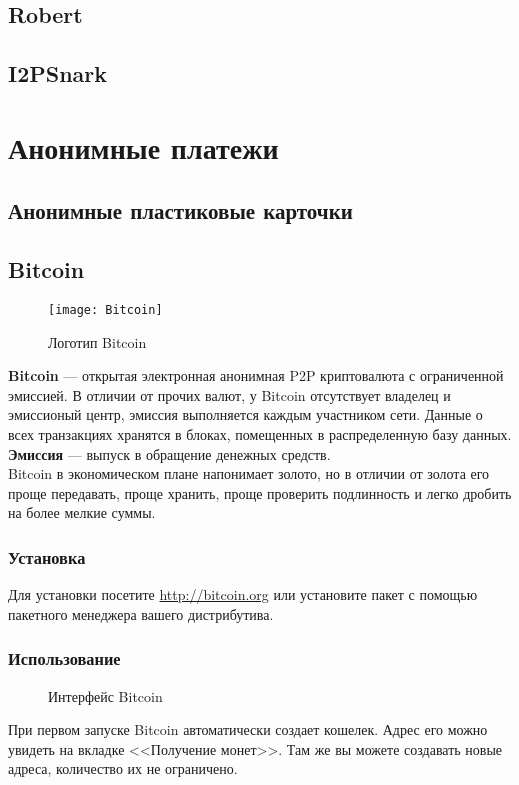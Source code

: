 \subsection{Robert}
\subsection{I2PSnark}

\section{Анонимные платежи}
\subsection{Анонимные пластиковые карточки}
\subsection{Bitcoin}
\begin{wrapfigure}[6]{r}{0.25\linewidth}
\texttt{[image: Bitcoin]}
\caption{Логотип Bitcoin}
\end{wrapfigure}
\textbf{Bitcoin} --- открытая электронная анонимная P2P криптовалюта с ограниченной эмиссией. В отличии от прочих валют, у Bitcoin отсутствует владелец и эмиссионый центр, эмиссия выполняется каждым участником сети. Данные о всех транзакциях хранятся в блоках, помещенных в распределенную базу данных.\\
\textbf{Эмиссия} --- выпуск в обращение денежных средств.\\
Bitcoin в экономическом плане напонимает золото, но в отличии от золота его проще передавать, проще хранить, проще проверить подлинность и легко дробить на более мелкие суммы.
\subsubsection{Установка}
Для установки посетите \url{http://bitcoin.org} или установите пакет с помощью пакетного менеджера вашего дистрибутива.
\subsubsection{Использование}
\begin{figure}[h]
\caption{Интерфейс Bitcoin}
\end{figure}
При первом запуске Bitcoin автоматически создает кошелек. Адрес его можно увидеть на вкладке <<Получение монет>>. Там же вы можете создавать новые адреса, количество их не ограничено.
